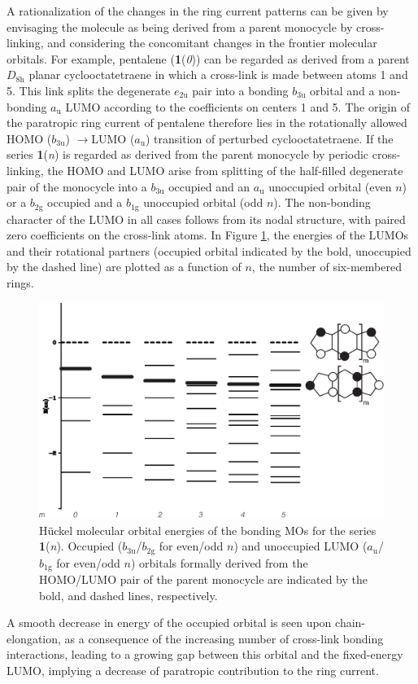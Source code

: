 A rationalization of the changes in the ring current patterns can be given by envisaging the molecule as being derived from a parent monocycle by cross-linking, and considering the concomitant changes in the frontier molecular orbitals. For example, pentalene (\textbf{1}(\textit{0})) can be regarded as derived from a parent $D_\mathrm{8h}$ planar cyclooctatetraene in which a cross-link is made between atoms 1 and 5. This link splits the degenerate $e_\mathrm{2u}$ pair into a bonding $b_\mathrm{3u}$ orbital and a non-bonding $a_\mathrm{u}$ LUMO according to the coefficients on centers 1 and 5. The origin of the paratropic ring current of pentalene therefore lies in the rotationally allowed HOMO ($b_\mathrm{3u}$) $\rightarrow$LUMO ($a_\mathrm{u}$) transition   \cite{r05,r35,r36} of perturbed cyclooctatetraene. If the series \textbf{1}(\textit{n}) is regarded as derived from the parent monocycle by periodic cross-linking, the HOMO and LUMO arise from splitting of the half-filled degenerate pair of the monocycle into a $b_\mathrm{3u}$ occupied and an $a_\mathrm{u}$ unoccupied orbital (even $n$) or a $b_\mathrm{2g}$ occupied and a $b_\mathrm{1g}$ unoccupied orbital (odd $n$). The non-bonding character of the LUMO in all cases follows from its nodal structure, with paired zero coefficients on the cross-link atoms. In Figure \ref{ch7.fig05}, the energies of the LUMOs and their rotational partners (occupied orbital indicated by the bold, unoccupied by the dashed line) are plotted as a function of $n$, the number of six-membered rings.
\begin{figure}
\center
\includegraphics[width=5.5in]{indacene/figures/figure5.eps}
\caption{H\"uckel molecular orbital energies of the bonding MOs for the series \textbf{1}(\textit{n}). Occupied ($b_\mathrm{3u}$/$b_\mathrm{2g}$ for even/odd $n$) and unoccupied LUMO ($a_\mathrm{u}$/$b_\mathrm{1g}$ for even/odd $n$) orbitals formally derived from the HOMO/LUMO pair of the parent monocycle are indicated by the bold, and dashed lines, respectively.}
\label{ch7.fig05}
\end{figure}
A smooth decrease in energy of the occupied orbital is seen upon chain-elongation, as a consequence of the increasing number of cross-link bonding interactions, leading to a growing gap between this orbital and the fixed-energy LUMO, implying a decrease of paratropic contribution to the ring current.

